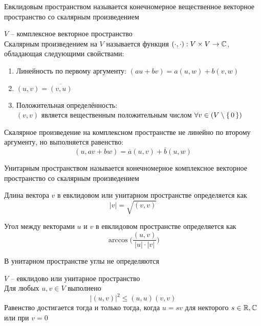 \begin{definition}
	Евклидовым пространством называется конечномерное вещественное векторное \\
	пространство со скалярным произведением
\end{definition}

\begin{definition}
	$ V $ -- комплексное векторное пространство \\
	Скалярным произведением на $ V $ называется функция $ (\cdot, \cdot) : V \times V \to \mathbb{C} $, обладающая следующими свойствами:
	\begin{enumerate}
		\item Линейность по первому аргументу: $ (au + bv) = a(u, w) + b(v, w) $
		\item $ (u, v) = \overline{(v, u)} $
		\item Положительная определённость: \\
		$ (v, v) $ является вещественным положительным числом $ \forall v \in (V \setminus \set{0}) $
	\end{enumerate}
\end{definition}

\begin{note}
	Скалярное произведение на комплексном пространстве не линейно по второму аргументу, но выполняется равенство:
	$$ (u, av + bw) = \overline{a}(u, v) + \overline{b}(u, w) $$
\end{note}

\begin{definition}
	Унитарным пространством называется конечномерное комплексное векторное пространство со скалярным произведением
\end{definition}

\begin{definition}
	Длина вектора $ v $ в евклидовом или унитарном пространстве определяется как
	$$ |v| = \sqrt{(v, v)} $$
\end{definition}

\begin{definition}
	Угол между векторами $ u $ и $ v $ в евклидовом пространстве определяется как
	$$ \arccos \bigg( \frac{(u, v)}{|u| \cdot |v|} \bigg) $$
\end{definition}

\begin{note}
	В унитарном пространстве углы не определяются
\end{note}

\begin{theorem}
	$ V $ -- евклидово или унитарное пространство \\
	Для любых $ u, v \in V $ выполнено
	$$ |(u, v)|^2 \le (u, u)(v, v) $$
	Равенство достигается тогда и только тогда, когда $ u = sv $ для некторого $ s \in \mathbb{R}, \mathbb{C} $ или при $ v = 0 $
\end{theorem}

